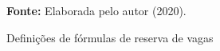 \begin{figure}[ht!]
\centering

\caption{\textmd{Definições de fórmulas de reserva de vagas}}
\label{fig:calcvagas}

\par\medskip\textbf{Fonte:} Elaborada pelo autor (2020). \par\medskip

\end{figure}
